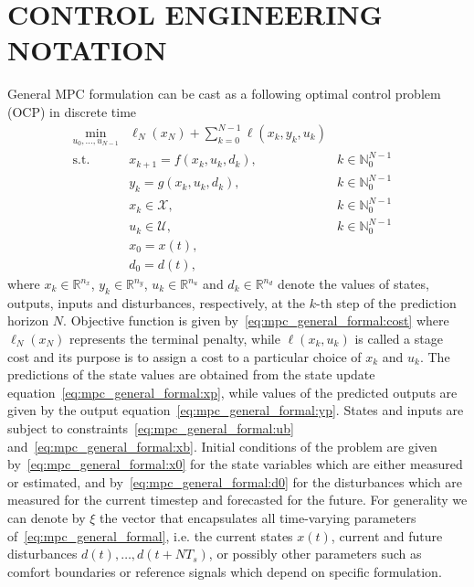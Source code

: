 \documentclass[10pt]{extarticle}
\begin{document}
\section{CONTROL ENGINEERING NOTATION}

General MPC formulation can be cast as a following optimal control problem (OCP) in discrete time
\begin{subequations}
	\label{eq:mpc_general_formal}
	\begin{align}
	\min_{u_0, \ldots, u_{N-1}} & \ell_N(x_N) + \sum_{k=0}^{N-1} \ell(x_k, y_k, u_k) &
	\label{eq:mpc_general_formal:cost}\\
	\text{s.t.} \ & x_{k+1} = f(x_k, u_k, d_k),  & k \in \mathbb{N}_{0}^{N-1} & \label{eq:mpc_general_formal:xp} \\
	& y_{k} = g(x_k, u_k, d_k),  & k \in \mathbb{N}_{0}^{N-1} & \label{eq:mpc_general_formal:yp} \\
	&  x_{k} \in \mathcal{X},  & k \in \mathbb{N}_{0}^{N-1}   \label{eq:mpc_general_formal:ub}\\
	& u_{k} \in \mathcal{U}, & k \in \mathbb{N}_{0}^{N-1} 
	\label{eq:mpc_general_formal:xb}\\
	& x_0 = x(t),\label{eq:mpc_general_formal:x0} \\
	& d_0 = d(t),\label{eq:mpc_general_formal:d0}
	\end{align}
\end{subequations}
where $x_k \in \mathbb{R}^{n_x}$, $y_k \in \mathbb{R}^{n_y}$, $u_k \in \mathbb{R}^{n_u}$ and $d_k \in \mathbb{R}^{n_d}$ denote the values of states, outputs,
inputs and disturbances, respectively, at the $k$-th step of the prediction
horizon $N$. 
Objective function is given by~\eqref{eq:mpc_general_formal:cost} where   $\ell_N(x_N)$  represents the terminal penalty,
while $\ell(x_k,u_k)$  is called a stage cost and its
purpose is to assign a cost to a particular choice of $x_k$ and
$u_k$.
The predictions of the state values are obtained from the state update equation~\eqref{eq:mpc_general_formal:xp}, while values of the predicted outputs are given by
the output equation~\eqref{eq:mpc_general_formal:yp}.
States and inputs are subject to
constraints~\eqref{eq:mpc_general_formal:ub} and~\eqref{eq:mpc_general_formal:xb}.
Initial conditions of the problem are given by~\eqref{eq:mpc_general_formal:x0} for the state variables which are either  measured or estimated, and by~\eqref{eq:mpc_general_formal:d0} for the disturbances which are measured for the current timestep and forecasted for the future.
For generality we can denote by $\xi$ the vector that encapsulates all time-varying parameters
of~\eqref{eq:mpc_general_formal}, i.e. the current states $x(t)$,
current and future disturbances $d(t), \ldots, d(t+N T_s)$, or possibly other parameters such as comfort boundaries or reference signals which depend on specific formulation.
\end{document}
